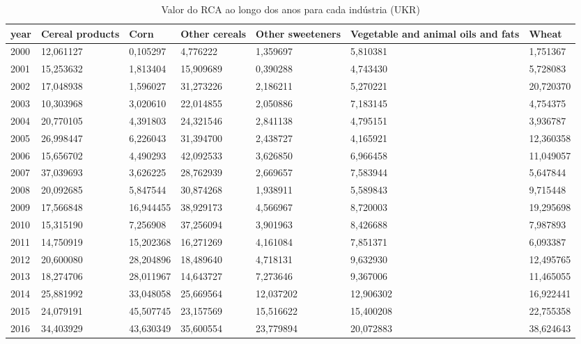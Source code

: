 \begin{table}
\centering
\caption{Valor do RCA ao longo dos anos para cada indústria (UKR)}
\begin{tabular}{p{1cm}p{2cm}p{2cm}p{2cm}p{2cm}p{2cm}p{2cm}}
\toprule
 year &  Cereal products &      Corn &  Other cereals &  Other sweeteners &  Vegetable and animal oils and fats &     Wheat \\
\midrule
 2000 &        12,061127 &  0,105297 &       4,776222 &          1,359697 &                            5,810381 &  1,751367 \\
 2001 &        15,253632 &  1,813404 &      15,909689 &          0,390288 &                            4,743430 &  5,728083 \\
 2002 &        17,048938 &  1,596027 &      31,273226 &          2,186211 &                            5,270221 & 20,720370 \\
 2003 &        10,303968 &  3,020610 &      22,014855 &          2,050886 &                            7,183145 &  4,754375 \\
 2004 &        20,770105 &  4,391803 &      24,321546 &          2,841138 &                            4,795151 &  3,936787 \\
 2005 &        26,998447 &  6,226043 &      31,394700 &          2,438727 &                            4,165921 & 12,360358 \\
 2006 &        15,656702 &  4,490293 &      42,092533 &          3,626850 &                            6,966458 & 11,049057 \\
 2007 &        37,039693 &  3,626225 &      28,762939 &          2,669657 &                            7,583944 &  5,647844 \\
 2008 &        20,092685 &  5,847544 &      30,874268 &          1,938911 &                            5,589843 &  9,715448 \\
 2009 &        17,566848 & 16,944455 &      38,929173 &          4,566967 &                            8,720003 & 19,295698 \\
 2010 &        15,315190 &  7,256908 &      37,256094 &          3,901963 &                            8,426688 &  7,987893 \\
 2011 &        14,750919 & 15,202368 &      16,271269 &          4,161084 &                            7,851371 &  6,093387 \\
 2012 &        20,600080 & 28,204896 &      18,489640 &          4,718131 &                            9,632930 & 12,495765 \\
 2013 &        18,274706 & 28,011967 &      14,643727 &          7,273646 &                            9,367006 & 11,465055 \\
 2014 &        25,881992 & 33,048058 &      25,669564 &         12,037202 &                           12,906302 & 16,922441 \\
 2015 &        24,079191 & 45,507745 &      23,157569 &         15,516622 &                           15,400208 & 22,755358 \\
 2016 &        34,403929 & 43,630349 &      35,600554 &         23,779894 &                           20,072883 & 38,624643 \\
\bottomrule
\end{tabular}
\end{table}
